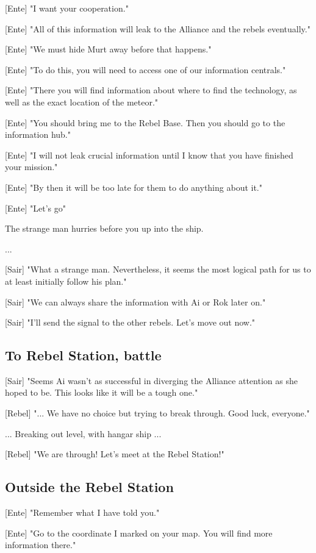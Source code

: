 \documentclass[a4paper,12pt]{article}
\begin{document}
[Ente] "I want your cooperation." 

[Ente] "All of this information will leak to the Alliance and the rebels eventually." 

[Ente] "We must hide Murt away before that happens."

[Ente] "To do this, you will need to access one of our information centrals." 

[Ente] "There you will find information about where to find the technology, as well as the exact location of the meteor."

[Ente] "You should bring me to the Rebel Base. Then you should go to the information hub."

[Ente] "I will not leak crucial information until I know that you have finished your mission."

[Ente] "By then it will be too late for them to do anything about it."

[Ente] "Let's go"

The strange man hurries before you up into the ship.

...

[Sair] "What a strange man. Nevertheless, it seems the most logical path for us to at least initially follow his plan."

[Sair] "We can always share the information with Ai or Rok later on."

[Sair] "I'll send the signal to the other rebels. Let's move out now."

\subsection{To Rebel Station, battle}

[Sair] "Seems Ai wasn't as successful in diverging the Alliance attention as she hoped to be. This looks like it will be a tough one."

[Rebel] "... We have no choice but trying to break through. Good luck, everyone."

... Breaking out level, with hangar ship ...

[Rebel] "We are through! Let's meet at the Rebel Station!"

\subsection{Outside the Rebel Station}

[Ente] "Remember what I have told you." 

[Ente] "Go to the coordinate I marked on your map. You will find more information there."
\end{document}
